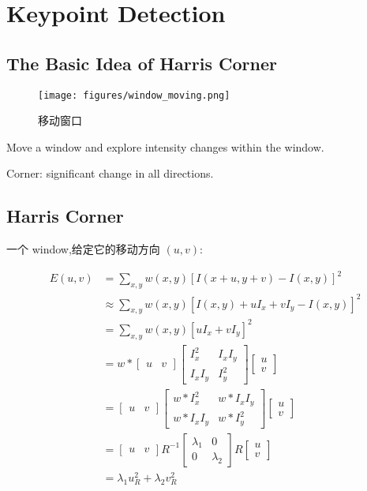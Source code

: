 \section{Keypoint Detection}

\subsection{The Basic Idea of Harris Corner}

\begin{figure}[htbp]
    \centering
    \texttt{[image: figures/window\_moving.png]}
    \caption{移动窗口}    
\end{figure}

Move a window and explore intensity changes within the window.

Corner: significant change in all directions.

\subsection{Harris Corner}

一个 window,给定它的移动方向 $(u,v)$:

\begin{equation}
    \begin{aligned}
    E(u,v) &= \sum_{x,y} w(x,y) [I(x+u,y+v) - I(x,y)]^2\\
    &\approx \sum_{x,y} w(x,y) [I(x,y) + uI_x + vI_y - I(x,y)]^2\\
    &= \sum_{x,y} w(x,y) [uI_x + vI_y]^2\\
    &= w \ast \begin{bmatrix} u & v \end{bmatrix} \begin{bmatrix} I_x^2 & I_xI_y \\ I_xI_y & I_y^2 \end{bmatrix} \begin{bmatrix} u \\ v \end{bmatrix}\\
    &= \begin{bmatrix} u & v \end{bmatrix} \begin{bmatrix} w \ast I_x^2 & w \ast I_xI_y \\ w \ast I_xI_y & w \ast I_y^2 \end{bmatrix} \begin{bmatrix} u \\ v \end{bmatrix}\\
    &= \begin{bmatrix} u & v \end{bmatrix} R^{-1} \begin{bmatrix} \lambda_1 & 0\\ 0 & \lambda_2 \end{bmatrix} R \begin{bmatrix} u \\ v \end{bmatrix}\\
    &= \lambda_1 u_R^2 + \lambda_2 v_R^2
    \end{aligned}
\end{equation}

